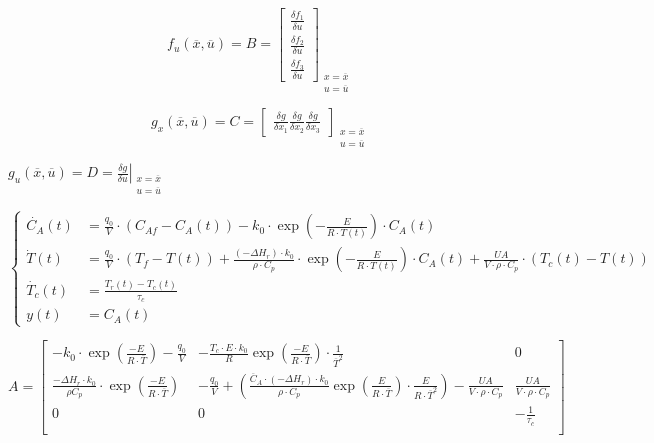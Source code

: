\documentclass{report}
\begin{document}
	\begin{equation}
		f_u(\overline{x},\overline{u}) = B =
		\begin{bmatrix}
			\frac{\delta f_1}{\delta u} \\[5pt]
			\frac{\delta f_2}{\delta u} \\[5pt]
			\frac{\delta f_3}{\delta u}
		\end{bmatrix}_{\substack{x=\overline{x} \\ u=\overline{u}}}
	\end{equation}
	
		\begin{equation}
		g_x(\overline{x},\overline{u}) = C =
		\begin{bmatrix}
			\frac{\delta g}{\delta x_1} 
			\frac{\delta g}{\delta x_2}
			\frac{\delta g}{\delta x_3}
		\end{bmatrix}_{\substack{x=\overline{x} \\ u=\overline{u}}}
	\end{equation}
	
	$g_u(\overline{x}, \overline{u}) = D = \left.\frac{\delta g}{\delta u}\right|_{\substack{x=\overline{x} \\ u=\overline{u}}}$
	
	
	\begin{equation}
		\begin{cases}
			\dot{C_A}(t) &= \frac{q_0}{V}\cdot (C_{Af}-C_A(t))-k_0\cdot \exp \left({-\frac{E}{R\cdot T(t)}} \right) \cdot C_A(t) \\[7pt]
			\dot{T}(t)&=\frac{q_0}{V}\cdot (T_f-T(t))+ \frac{(-\Delta H_r)\cdot k_0}{\rho \cdot C_p}\cdot \exp{\left( -\frac{E}{R \cdot T(t)} \right)}\cdot C_A(t) + \frac{UA}{V\cdot\rho\cdot C_p}\cdot(T_c(t) - T(t))\\[7pt]
			\dot{T_c}(t) &= \frac{T_r(t)-T_c(t)}{\tau_c} \\[7pt]
			y(t) &= C_A(t)
		\end{cases}
	\end{equation}
	
	\begin{equation}
	A =
		\begin{bmatrix}
			-k_0\cdot \exp{\left(\frac{-E}{R\cdot \overline{T}}\right)}-\frac{q_0}{V} & - \frac{T_c\cdot E \cdot k_0}{R} \exp{\left(\frac{-E}{R\cdot\overline{T}} \right)}\cdot\frac{1}{\overline{T}^2} & 0 \\[10pt]
			
			\frac{-\Delta H_r \cdot k_0}{\rho C_p} \cdot\exp{\left(\frac{-E}{R\cdot \overline{T}}\right)}&-\frac{q_0}{V}+ (\frac{\overline{C}_A\cdot (-\Delta H_r)\cdot k_0}{\rho\cdot C_p} \exp{\left(\frac{E}{R \cdot\overline{T}} \right)}\cdot\frac{E}{R\cdot\overline{T}^2}) - \frac{UA}{V\cdot\rho\cdot C_p}  & \frac{UA}{V\cdot\rho\cdot C_p} \\[10pt]
			
			
			0 & 0 & -\frac{1}{\tau_c} \\			
		\end{bmatrix}
	\end{equation}
	
\end{document}
